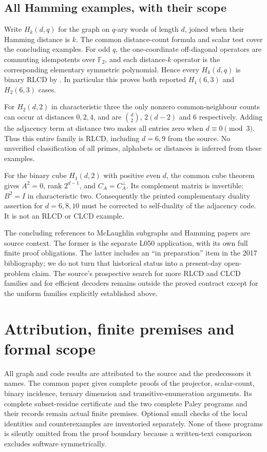 \subsection{All Hamming examples, with their scope}
Write $H_k(d,q)$ for the graph on $q$-ary words of length $d$, joined
when their Hamming distance is $k$. The common distance-count formula
 and scalar test cover the concluding examples.
For odd $q$, the one-coordinate off-diagonal operators are commuting
idempotents over $\mathbb F_2$, and each distance-$k$ operator is the
corresponding elementary symmetric polynomial. Hence every
$H_k(d,q)$ is binary RLCD by .
In particular this proves both reported $H_1(6,3)$ and $H_2(6,3)$ cases.

For $H_2(d,2)$ in characteristic three the only nonzero common-neighbour
counts can occur at distances $0,2,4$, and are
$\binom d2$, $2(d-2)$ and $6$ respectively. Adding the adjacency term
at distance two makes all entries zero when $d\equiv0\pmod3$.
Thus this entire family is RLCD, including $d=6,9$ from the source.
No unverified classification of all primes, alphabets or distances is
inferred from these examples.

For the binary cube $H_1(d,2)$ with positive even $d$, the common cube
theorem gives $A^2=0$, rank $2^{d-1}$, and
$C_A=C_A^\perp$. Its complement matrix is invertible:
$B^2=I$ in characteristic two. Consequently the printed complementary
duality assertion for $d=6,8,10$ must be corrected to self-duality of
the adjacency code. It is not an RLCD or CLCD example.

The concluding references to McLaughlin subgraphs and Hamming papers
are source context. The former is the separate L050 application, with
its own full finite proof obligations. The latter includes an
``in preparation'' item in the 2017 bibliography; we do not turn that
historical status into a present-day open-problem claim.
The source's prospective search for more RLCD and CLCD families and
for efficient decoders remains outside the proved contract except for
the uniform families explicitly established above.

\section{Attribution, finite premises and formal scope}
All graph and code results are attributed to the source and the
predecessors it names. The common paper gives complete proofs of the
projector, scalar-count, binary incidence, ternary dimension and
transitive-enumeration arguments. Its complete subset-residue certificate
and the two complete Paley programs and their records remain actual
finite premises. Optional small checks of the local identities and
counterexamples are inventoried separately. None of these programs is
silently omitted from the proof boundary because a written-text
comparison excludes software symmetrically.

